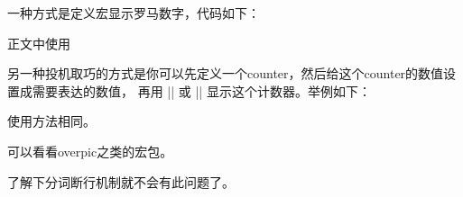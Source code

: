 




一种方式是定义宏显示罗马数字，代码如下：
\begin{texlist}
  \newcommand{\Myroman}[1]{\romannumeral #1}
  \newcommand{\MyRoman}[1]{\expandafter\@slowromancap\romannumeral #1@}
\end{texlist}
正文中使用
\begin{texlist}
   
\end{texlist}

另一种投机取巧的方式是你可以先定义一个counter，然后给这个counter的数值设置成需要表达的数值，
再用 |\Roman| 或 |\roman| 显示这个计数器。举例如下：
\begin{texlist}
  \newcommand{\MyRoman}[1]{\setcounter{romannum}{#1}\Roman{romannum}}
  \newcommand{\Myroman}[1]{\setcounter{romannum}{#1}\roman{romannum}}
\end{texlist}
使用方法相同。



\begin{texlist}
\end{texlist}



可以看看overpic之类的宏包。



了解下分词断行机制就不会有此问题了。












